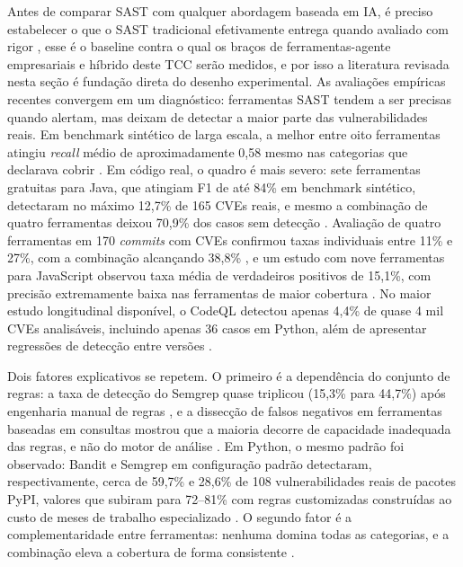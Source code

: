 Antes de comparar SAST com qualquer abordagem baseada em IA, é preciso estabelecer o que o SAST tradicional efetivamente entrega quando avaliado com rigor , esse é o baseline contra o qual os braços de ferramentas-agente empresariais e híbrido deste TCC serão medidos, e por isso a literatura revisada nesta seção é fundação direta do desenho experimental. As avaliações empíricas recentes convergem em um diagnóstico: ferramentas SAST tendem a ser precisas quando alertam, mas deixam de detectar a maior parte das vulnerabilidades reais. Em benchmark sintético de larga escala, a melhor entre oito ferramentas atingiu \textit{recall} médio de aproximadamente 0,58 mesmo nas categorias que declarava cobrir \cite{Esposito2024SASTComparison}. Em código real, o quadro é mais severo: sete ferramentas gratuitas para Java, que atingiam F1 de até 84\% em benchmark sintético, detectaram no máximo 12,7\% de 165 CVEs reais, e mesmo a combinação de quatro ferramentas deixou 70,9\% dos casos sem detecção \cite{Li2023SASTJava}. Avaliação de quatro ferramentas em 170 \textit{commits} com CVEs confirmou taxas individuais entre 11\% e 27\%, com a combinação alcançando 38,8\% \cite{Bennett2024Semgrep}, e um estudo com nove ferramentas para JavaScript observou taxa média de verdadeiros positivos de 15,1\%, com precisão extremamente baixa nas ferramentas de maior cobertura \cite{Brito2023JSSAST}. No maior estudo longitudinal disponível, o CodeQL detectou apenas 4,4\% de quase 4 mil CVEs analisáveis, incluindo apenas 36 casos em Python, além de apresentar regressões de detecção entre versões \cite{Noirot2025CodeQLLongitudinal}.

Dois fatores explicativos se repetem. O primeiro é a dependência do conjunto de regras: a taxa de detecção do Semgrep quase triplicou (15,3\% para 44,7\%) após engenharia manual de regras \cite{Bennett2024Semgrep}, e a dissecção de falsos negativos em ferramentas baseadas em consultas mostrou que a maioria decorre de capacidade inadequada das regras, e não do motor de análise \cite{Li2024SASTCC, Li2023SASTJava}. Em Python, o mesmo padrão foi observado: Bandit e Semgrep em configuração padrão detectaram, respectivamente, cerca de 59,7\% e 28,6\% de 108 vulnerabilidades reais de pacotes PyPI, valores que subiram para 72–81\% com regras customizadas construídas ao custo de meses de trabalho especializado \cite{Marquer2026SAGA}. O segundo fator é a complementaridade entre ferramentas: nenhuma domina todas as categorias, e a combinação eleva a cobertura de forma consistente \cite{Esposito2024SASTComparison, Zhu2024SASTAndroid, Dalaq2025SASTSLR}.

